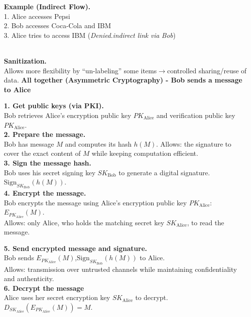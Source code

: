 \documentclass[main.tex]{subfiles}
\begin{document}
\begin{minipage}[t]{0.495\textwidth}
	\begin{minipage}[t]{0.63\textwidth}
		\textbf{Example (Indirect Flow).}\\
		1. Alice accesses Pepsi\\
		2. Bob accesses Coca-Cola and IBM\\
		3. Alice tries to access IBM (\textit{Denied.indirect link via Bob})
	\end{minipage}\\[2px]
	\textbf{Sanitization.}\\
	Allows more flexibility by “un-labeling” some items$\to$controlled sharing/reuse of data.
	\hline
	\textbf{All together (Asymmetric Cryptography) - Bob sends a message to Alice}\\
	\begin{minipage}[t]{0.49\textwidth}
		\textbf{1. Get public keys (via PKI).}\\
		Bob retrieves Alice’s encryption public key $PK_{\text{Alice}}$ and verification public key $PK_{\text{Alice}}$.\\
		\textbf{2. Prepare the message.}\\
		Bob has message $M$ and computes its hash $h(M)$.
		Allows: the signature to cover the exact content of $M$ while keeping computation efficient.\\
		\textbf{3. Sign the message hash.}\\
		Bob uses his secret signing key $SK_{\text{Bob}}$ to generate a digital signature. $\text{Sign}_{SK_{\text{Bob}}}(h(M))$.\\
		\textbf{4. Encrypt the message.}\\
		Bob encrypts the message using Alice’s encryption public key $PK_{\text{Alice}}$: $E_{PK_{\text{Alice}}}(M)$.\\
		Allows: only Alice, who holds the matching secret key $SK_{\text{Alice}}$, to read the message.
	\end{minipage}\hfill
	\begin{minipage}[t]{0.49\textwidth}
		\textbf{5. Send encrypted message and signature.}\\
		Bob sends $E_{PK_{\text{Alice}}}(M)$,$\text{Sign}_{SK_{\text{Bob}}}(h(M))$ to Alice.\\
		Allows: transmission over untrusted channels while maintaining confidentiality and authenticity.\\
		\textbf{6. Decrypt the message}\\
		Alice uses her secret encryption key $SK_{\text{Alice}}$ to decrypt. $D_{SK_{\text{Alice}}}(E_{PK_{\text{Alice}}}(M)) = M$.\\

\end{minipage}
\end{minipage}
\end{document}
